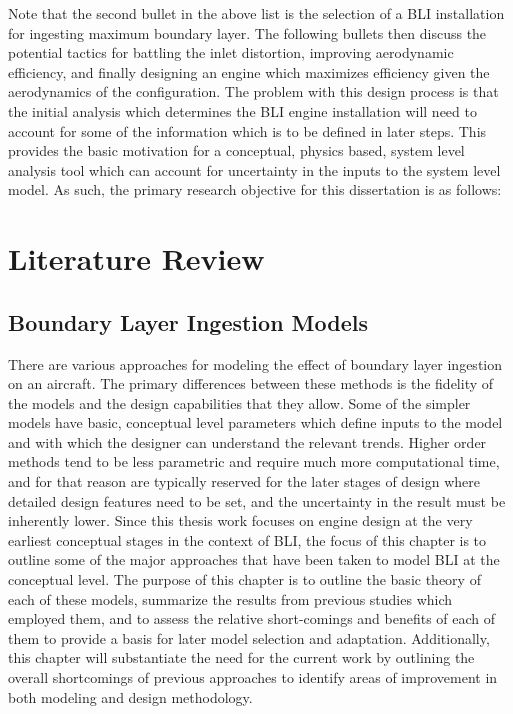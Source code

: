 \documentclass[12pt]{gatech-thesis}
\begin{document}
Note that the second bullet in the above list is the selection of a BLI installation for ingesting maximum boundary layer.  The following bullets then discuss the potential tactics for battling the inlet distortion, improving aerodynamic efficiency, and finally designing an engine which maximizes efficiency given the aerodynamics of the configuration.  The problem with this design process is that the initial analysis which determines the BLI engine installation will need to account for some of the information which is to be defined in later steps.  This provides the basic motivation for a conceptual, physics based, system level analysis tool which can account for uncertainty in the inputs to the system level model.  As such, the primary research objective for this dissertation is as follows:

\vspace{25pt}



\chapter{Literature Review}

\section{Boundary Layer Ingestion Models}

There are various approaches for modeling the effect of boundary layer ingestion on an aircraft.  The primary differences between these methods is the fidelity of the models and the design capabilities that they allow.  Some of the simpler models have basic, conceptual level parameters which define inputs to the model and with which the designer can understand the relevant trends.  Higher order methods tend to be less parametric and require much more computational time, and for that reason are typically reserved for the later stages of design where detailed design features need to be set, and the uncertainty in the result must be inherently lower.  Since this thesis work focuses on engine design at the very earliest conceptual stages in the context of BLI, the focus of this chapter is to outline some of the major approaches that have been taken to model BLI at the conceptual level.  The purpose of this chapter is to outline the basic theory of each of these models, summarize the results from previous studies which employed them, and to assess the relative short-comings and benefits of each of them to provide a basis for later model selection and adaptation.  Additionally, this chapter will substantiate the need for the current work by outlining the overall shortcomings of previous approaches to identify areas of improvement in both modeling and design methodology.
\end{document}
